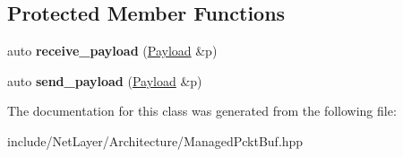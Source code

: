 \subsection*{Protected Member Functions}
\begin{DoxyCompactItemize}
\item 
\hypertarget{classnl_1_1impl_1_1ManagedPcktBuf_a1e28a6735c585548b8277b5544101d3f}{}auto {\bfseries receive\+\_\+payload} (\hyperlink{structnl_1_1Payload}{Payload} \&p)\label{classnl_1_1impl_1_1ManagedPcktBuf_a1e28a6735c585548b8277b5544101d3f}

\item 
\hypertarget{classnl_1_1impl_1_1ManagedPcktBuf_a16cb9aa8f9c0153f0a6af9bc352161ec}{}auto {\bfseries send\+\_\+payload} (\hyperlink{structnl_1_1Payload}{Payload} \&p)\label{classnl_1_1impl_1_1ManagedPcktBuf_a16cb9aa8f9c0153f0a6af9bc352161ec}

\end{DoxyCompactItemize}


The documentation for this class was generated from the following file\+:\begin{DoxyCompactItemize}
\item 
include/\+Net\+Layer/\+Architecture/Managed\+Pckt\+Buf.\+hpp\end{DoxyCompactItemize}
